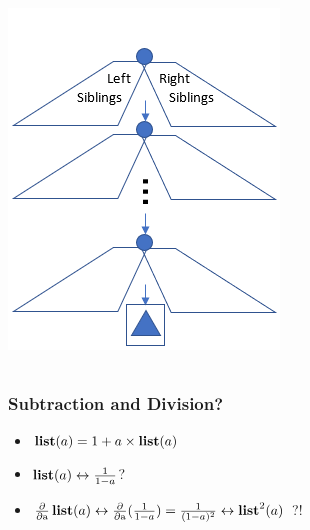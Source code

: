 \begin{frame}
\begin{columns}
\begin{column}{0.4\textwidth}
\centering
\includegraphics[width=\textwidth]{figure/zipper_rev}
\end{column}
\end{columns}
\end{frame}

\begin{frame}
\frametitle{Subtraction and Division?}

\begin{itemize}
\item $\operatorname{\textbf{list}}(a) = 1 + a \times \operatorname{\textbf{list}}(a)$
\item $\operatorname{\textbf{list}}(a) \leftrightarrow \frac{1}{1-a}$?
\item $\operatorname{\frac{\partial}{\partial a}}\operatorname{\textbf{list}}(a) \leftrightarrow \operatorname{\frac{\partial}{\partial a}}(\frac{1}{1-a})
= \frac{1}{(1-a)^2} \leftrightarrow \operatorname{\textbf{list}}^2(a)$ ?!
\end{itemize}
\end{frame}
